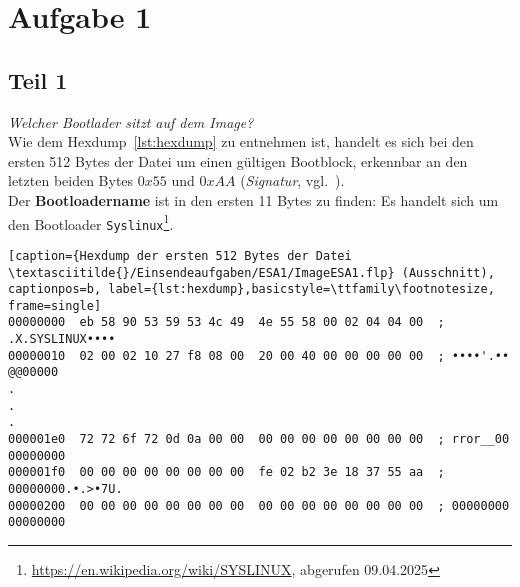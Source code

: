 \chapter{Aufgabe 1}

\section{Teil 1}
\textit{Welcher Bootlader sitzt auf dem Image?}\\

\noindent
Wie dem Hexdump~\ref{lst:hexdump} zu entnehmen ist, handelt es sich bei den ersten 512 Bytes der Datei um einen gültigen Bootblock, erkennbar an den letzten beiden Bytes $0x55$ und $0xAA$ (\textit{Signatur}, vgl.~\cite[142]{ES4}).\\
Der \textbf{Bootloadername} ist in den ersten 11 Bytes zu finden: Es handelt sich um den Bootloader \texttt{Syslinux}\footnote{
\url{https://en.wikipedia.org/wiki/SYSLINUX}, abgerufen 09.04.2025
}.

\vspace{5mm}

\begin{lstlisting}[caption={Hexdump der ersten 512 Bytes der Datei \textasciitilde{}/Einsendeaufgaben/ESA1/ImageESA1.flp} (Ausschnitt), captionpos=b, label={lst:hexdump},basicstyle=\ttfamily\footnotesize, frame=single]
00000000  eb 58 90 53 59 53 4c 49  4e 55 58 00 02 04 04 00  ; .X.SYSLINUX••••
00000010  02 00 02 10 27 f8 08 00  20 00 40 00 00 00 00 00  ; ••••'.•• @@00000
.
.
.
000001e0  72 72 6f 72 0d 0a 00 00  00 00 00 00 00 00 00 00  ; rror__00 00000000
000001f0  00 00 00 00 00 00 00 00  fe 02 b2 3e 18 37 55 aa  ; 00000000.•.>•7U.
00000200  00 00 00 00 00 00 00 00  00 00 00 00 00 00 00 00  ; 00000000 00000000
\end{lstlisting}
